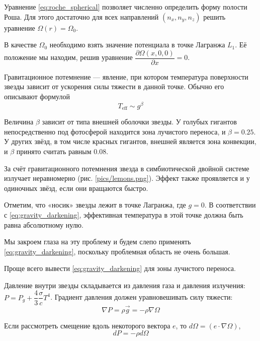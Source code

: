 Уравнение \eqref{eq:roche_spherical} позволяет численно определить форму полости Роша. Для этого достаточно для всех направлений $(n_x, n_y, n_z)$ решить уравнение $\Omega(r) = \Omega_0.$

В качестве $\Omega_0$ необходимо взять значение потенциала в точке Лагранжа $L_1$. Её положение мы находим, решив уравнение $\dfrac{\partial \Omega(x, 0, 0)}{\partial x} = 0$.



Гравитационное потемнение --- явление, при котором температура поверхности звезды зависит от ускорения силы тяжести в данной точке. Обычно его описывают формулой
\begin{equation}
T_\text{eff} \sim g^\beta
\label{eq:gravity_darkening}
\end{equation}

Величина $\beta$ зависит от типа внешней оболочки звезды. У голубых гигантов непосредственно под фотосферой находится зона лучистого переноса, и $\beta = 0.25$. У других звёзд, в том числе красных гигантов, внешней является зона конвекции, и $\beta$ принято считать равным $0.08$.

За счёт гравитационного потемнения звезда в симбиотической двойной системе излучает неравномерно (рис. \ref{pics/lemons.png}). Эффект также проявляется и у одиночных звёзд, если они вращаются быстро.


Отметим, что «носик» звезды лежит в точке Лагранжа, где $g = 0$. В соответствии с \eqref{eq:gravity_darkening}, эффективная температура в этой точке должна быть равна абсолютному нулю.

Мы закроем глаза на эту проблему и будем слепо применять \eqref{eq:gravity_darkening}, поскольку проблемная область не очень большая.


Проще всего вывести \eqref{eq:gravity_darkening} для зоны лучистого переноса.

Давление внутри звезды складывается из давления газа и давления излучения: $P = P_g + \dfrac{4}{3} \dfrac{\sigma}{c} T^4$.
Градиент давления должен уравновешивать силу тяжести:
\[
\nabla P = \rho \vec g = -\rho \nabla \Omega
\]

Если рассмотреть смещение вдоль некоторого вектора $e$, то $d\Omega = (e \cdot \nabla \Omega)$,
\[
dP = -\rho d\Omega
\]

